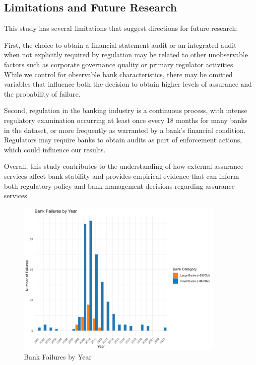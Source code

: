\documentclass[12pt]{article}
\begin{document}
\subsection{Limitations and Future Research}

This study has several limitations that suggest directions for future research:

First, the choice to obtain a financial statement audit or an integrated audit when not explicitly required by regulation may be related to other unobservable factors such as corporate governance quality or primary regulator activities. While we control for observable bank characteristics, there may be omitted variables that influence both the decision to obtain higher levels of assurance and the probability of failure.

Second, regulation in the banking industry is a continuous process, with intense regulatory examination occurring at least once every 18 months for many banks in the dataset, or more frequently as warranted by a bank's financial condition. Regulators may require banks to obtain audits as part of enforcement actions, which could influence our results.

Overall, this study contributes to the understanding of how external assurance services affect bank stability and provides empirical evidence that can inform both regulatory policy and bank management decisions regarding assurance services.

\clearpage
\begin{figure}[H]
    \centering
    \includegraphics[width=0.9\textwidth]{bank_failures_plot.png}
    \caption{Bank Failures by Year}
    \label{fig:bank_failures}
\end{figure}
\end{document}

